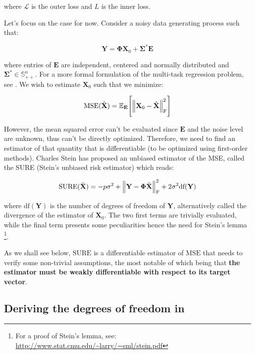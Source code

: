 \documentclass[a4paper,10pt]{article}
\theoremstyle{definition}
\begin{document}
where $\mathcal{L}$ is the outer loss and $L$ is the inner loss.

Let's focus on the  case for now. Consider a noisy data generating process such that:

\begin{equation*}
    \mathbf{Y} = \mathbf{\Phi}\mathbf{X}_0 + \mathbf{\Sigma^*}\mathbf{E}
\end{equation*}

where entries of $\mathbf{E}$ are independent, centered and normally distributed and $\mathbf{\Sigma^*} \in \mathbb{S}^n_{++}$. For a more formal
formulation of the multi-task regression problem, see \cite{Massias_Fercoq_Gramfort_Salmon17}. We wish to estimate
$\mathbf{X}_0$ such that we minimize:

\begin{equation*}
    \text{MSE}(\hat{\mathbf{X}}) = \mathbb{E}_{\mathbf{E}}\Biggl[ \left \lVert \mathbf{X}_0 - \hat{\mathbf{X}} \right \rVert_{\text{F}}^2 \Biggr]
\end{equation*}

However, the mean squared error can't be evaluated since $\mathbf{E}$ and the noise level
are unknown, thus can't be directly optimized. Therefore, we need to find an estimator of that
quantity that is differentiable (to be optimized using first-order methods). Charles Stein has
proposed an unbiased estimator of the MSE, called the SURE (Stein's unbiased risk estimator) which reads:

\begin{equation*}
    \text{SURE}(\hat{\bf{X}}) = -p\sigma^2 + \left \lVert \mathbf{Y} - \mathbf{\Phi} \hat{\mathbf{X}} \right \rVert_{\text{F}}^2 + 2 \sigma^2 \text{df}(\bf{Y})
\end{equation*}

where $\text{df}(\mathbf{Y})$ is the number of degrees of freedom of $\mathbf{Y}$, alternatively called the divergence of
the estimator of $\mathbf{X}_0$. The two first terms are trivially evaluated, while the final term presents some
peculiarities hence the need for Stein's lemma \footnote{For a proof of Stein's lemma, see:
\url{http://www.stat.cmu.edu/~larry/=sml/stein.pdf}}.

As we shall see below, $\text{SURE}$ is a differentiable estimator of $\text{MSE}$ that needs to verify some
non-trivial assumptions, the most notable of which being that \textbf{the estimator must be weakly differentiable with
respect to its target vector}.

\subsection*{Deriving the degrees of freedom in }
\end{document}
